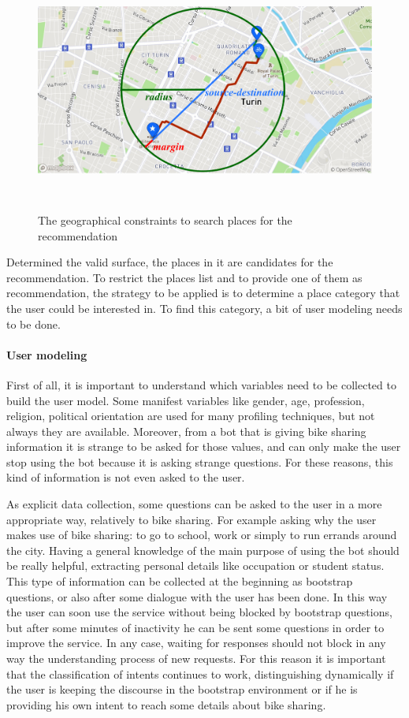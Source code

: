 \begin{figure}[!htbp]
    \centering
    \includegraphics[max width=\linewidth,max height=8cm,keepaspectratio]{figures/placesSearch}
    \caption{The geographical constraints to search places for the recommendation}\label{fig:placesSearch}
\end{figure}

Determined the valid surface, the places in it are candidates for the recommendation. To restrict the places list and to provide one of them as recommendation, the strategy to be applied is to determine a place category that the user could be interested in. To find this category, a bit of user modeling needs to be done.

\paragraph{User modeling}
First of all, it is important to understand which variables need to be collected to build the user model. Some manifest variables like gender, age, profession, religion, political orientation are used for many profiling techniques, but not always they are available. Moreover, from a bot that is giving bike sharing information it is strange to be asked for those values, and can only make the user stop using the bot because it is asking strange questions. For these reasons, this kind of information is not even asked to the user.

As explicit data collection, some questions can be asked to the user in a more appropriate way, relatively to bike sharing. For example asking why the user makes use of bike sharing: to go to school, work or simply to run errands around the city. Having a general knowledge of the main purpose of using the bot should be really helpful, extracting personal details like occupation or student status. This type of information can be collected at the beginning as bootstrap questions, or also after some dialogue with the user has been done. In this way the user can soon use the service without being blocked by bootstrap questions, but after some minutes of inactivity he can be sent some questions in order to improve the service. In any case, waiting for responses should not block in any way the understanding process of new requests. For this reason it is important that the classification of intents continues to work, distinguishing dynamically if the user is keeping the discourse in the bootstrap environment or if he is providing his own intent to reach some details about bike sharing. 

